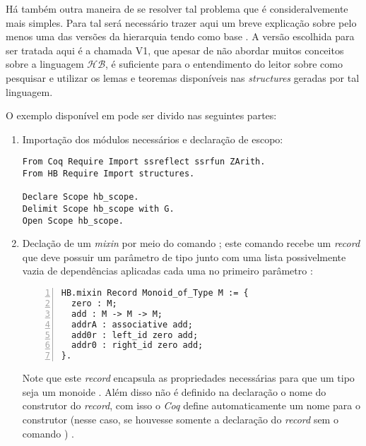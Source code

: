 {{Há também outra maneira de se resolver tal problema que é consideralvemente mais simples. Para tal será necessário trazer aqui um breve explicação sobre pelo menos uma das versões da hierarquia tendo como base \cite{cohen:hal-02478907}. A versão escolhida para ser tratada aqui é a chamada V1, que apesar de não abordar muitos conceitos sobre a linguagem $\mathcal{HB}$, é suficiente para o entendimento do leitor sobre como pesquisar e utilizar os lemas e teoremas disponíveis nas \textit{structures} geradas por tal linguagem.

O exemplo disponível em \cite{mathcomp-hb-v1} pode ser divido nas seguintes partes:
    \begin{enumerate}
        \item Importação dos módulos necessários e declaração de escopo:
        \begin{lstlisting}[language=coq, frame=single, tabsize=1]
From Coq Require Import ssreflect ssrfun ZArith.
From HB Require Import structures.

Declare Scope hb_scope.
Delimit Scope hb_scope with G.
Open Scope hb_scope.
        \end{lstlisting}
    
        \item \label{item:mixin-monoid} Declação de um \textit{mixin} por meio do comando ; este comando recebe um \textit{record} que deve possuir um parâmetro de tipo  junto com uma lista possivelmente vazia de dependências 
        aplicadas cada uma no primeiro parâmetro \cite{cohen:hal-02478907}:
            \begin{lstlisting}[language=coq, frame=single, tabsize=1, numbers=left]
HB.mixin Record Monoid_of_Type M := {
  zero : M;
  add : M -> M -> M;
  addrA : associative add;
  add0r : left_id zero add;
  addr0 : right_id zero add;
}.
            \end{lstlisting}
        Note que este \textit{record} encapsula as propriedades necessárias para que um tipo  seja um monoide \cite{cohen:hal-02478907}. Além disso não é definido na declaração o nome do construtor do \textit{record}, com isso o \textit{Coq} define automaticamente um nome para o construtor (nesse caso, se houvesse somente a declaração do \textit{record} sem o comando  ) \cite{cohen:hal-02478907}.


\end{enumerate}}}
